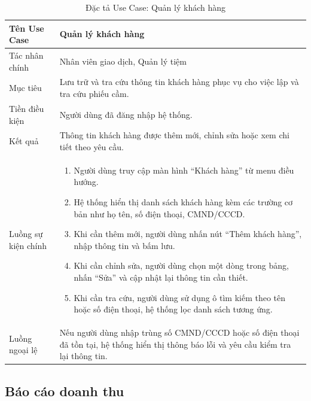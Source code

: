 \documentclass[13pt,a4paper]{extreport}
\begin{document}
\begin{table}[H]
\centering
\caption{Đặc tả Use Case: Quản lý khách hàng}
\label{tab:uc-customers}
\begin{tabular}{p{4cm}p{10cm}}
\hline
Tên Use Case & Quản lý khách hàng\\
\hline
Tác nhân chính & Nhân viên giao dịch, Quản lý tiệm\\
Mục tiêu & Lưu trữ và tra cứu thông tin khách hàng phục vụ cho việc lập và tra cứu phiếu cầm.\\
Tiền điều kiện & Người dùng đã đăng nhập hệ thống.\\
Kết quả & Thông tin khách hàng được thêm mới, chỉnh sửa hoặc xem chi tiết theo yêu cầu.\\
\hline
Luồng sự kiện chính &
\begin{enumerate}
  \item Người dùng truy cập màn hình ``Khách hàng'' từ menu điều hướng.
  \item Hệ thống hiển thị danh sách khách hàng kèm các trường cơ bản như họ tên, số điện thoại, CMND/CCCD.
  \item Khi cần thêm mới, người dùng nhấn nút ``Thêm khách hàng'', nhập thông tin và bấm lưu.
  \item Khi cần chỉnh sửa, người dùng chọn một dòng trong bảng, nhấn ``Sửa'' và cập nhật lại thông tin cần thiết.
  \item Khi cần tra cứu, người dùng sử dụng ô tìm kiếm theo tên hoặc số điện thoại, hệ thống lọc danh sách tương ứng.
\end{enumerate}\\
\hline
Luồng ngoại lệ &
Nếu người dùng nhập trùng số CMND/CCCD hoặc số điện thoại đã tồn tại, hệ thống hiển thị thông báo lỗi và yêu cầu kiểm tra lại thông tin.\\
\hline
\end{tabular}
\end{table}

\subsection*{Báo cáo doanh thu}
\end{document}
